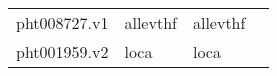\documentclass[11pt]{article}
\begin{document}
\begin{tabular}{r|lll}
	 pht008727.v1                                                                                                                                                                                                                                                                                                                                                                                           & allevthf                                                                                                                                                                                                                                                                                                                                                                                               & allevthf                                                                                                                                                                                                                                                                                                                                                                                              \\
	 pht001959.v2                                                                                                                                                                                                                                                                                                                                                                                           & loca                                                                                                                                                                                                                                                                                                                                                                                                   & loca                                                                                                                                                                                                                                                                                                                                                                                                  \\

\end{tabular}
\end{document}
